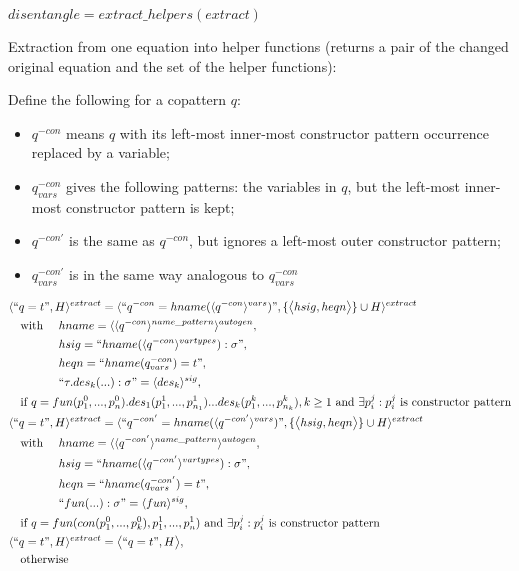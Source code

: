 \documentclass[11pt]{article} %
\begin{document}
$disentangle = extract\_helpers(extract)$

Extraction from one equation into helper functions (returns a pair of the changed original equation and the set of the helper functions):

Define the following for a copattern $q$:

\begin{itemize}
\item $q^{-con}$ means $q$ with its left-most inner-most constructor pattern occurrence replaced by a variable;
\item $q^{-con}_{vars}$ gives the following patterns: the variables in $q$, but the left-most inner-most constructor pattern is kept;
\item $q^{-con'}$ is the same as $q^{-con}$, but ignores a left-most outer constructor pattern;
\item $q^{-con'}_{vars}$ is in the same way analogous to $q^{-con}_{vars}$
\end{itemize}

\begin{alignat*}{3}
&\langle `` q = t ", H \rangle^{extract} = \langle `` q^{-con} = hname (\langle q^{-con} \rangle^{vars}) ", \{\big\langle hsig, heqn \big\rangle\} \cup H \rangle^{extract} \span\span \\
&\quad \textrm{with } && hname = \langle \langle q^{-con} \rangle^{name\_pattern} \rangle^{autogen}, \\
&\quad && hsig = `` hname(\langle q^{-con} \rangle^{vartypes}): \sigma ", \\
&\quad && heqn = `` hname(q^{-con}_{vars}) = t ", \\
&\quad && `` \tau.des_k(...): \sigma " = \langle des_k \rangle^{sig}, \\
&\quad \textrm{if } q = fun(p_1^0, ..., p_n^0).des_1(p_1^1, ..., p_{n_1}^1)...des_k(p_1^k, ..., p_{n_k}^k), k \geq 1 \textrm{ and } \exists p_i^j: p_i^j \textrm{ is constructor pattern} \span\span \\
&\langle `` q = t ", H \rangle^{extract} = \langle `` q^{-con'} = hname (\langle q^{-con'} \rangle^{vars}) ", \{\big\langle hsig, heqn \big\rangle\} \cup H \rangle^{extract} \span\span \\
&\quad \textrm{with } && hname = \langle \langle q^{-con'} \rangle^{name\_pattern} \rangle^{autogen}, \\
&\quad && hsig = `` hname(\langle q^{-con'} \rangle^{vartypes}): \sigma ", \\
&\quad && heqn = `` hname(q^{-con'}_{vars}) = t ", \\
&\quad && `` fun(...): \sigma " = \langle fun \rangle^{sig}, \\
&\quad \textrm{if } q = fun(con(p_1^0, ..., p_k^0), p^1_1, ..., p^1_n) \textrm{ and } \exists p_i^j: p_i^j \textrm{ is constructor pattern} \span\span \\
&\langle `` q = t ", H \rangle^{extract} = \big\langle `` q = t ", H \big\rangle, \span\span \\
&\quad \textrm{otherwise} \span\span
\end{alignat*}
\end{document}
